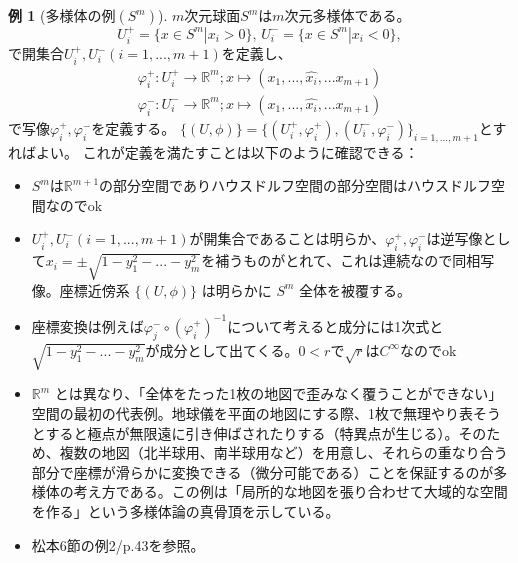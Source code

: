 \documentclass[paper=a4, fontsize=11pt]{jlreq} %
\theoremstyle{definition}
\newtheorem{example}[theorem]{例}
\begin{document}
\begin{example}[多様体の例$(S^{m})$]
    $m$次元球面$S^{m}$は$m$次元多様体である。
    \[
    U_{i}^{+} = \{x \in S^{m} | x_{i} > 0 \},\,U_{i}^{-} = \{x \in S^{m} | x_{i} < 0 \},
    \]
    で開集合$U_{i}^{+},U_{i}^{-}(i = 1,...,m+1)$を定義し、
    \begin{gather*}
    \varphi_{i}^{+} : U_{i}^{+} \to \mathbb{R}^{m} ; x \mapsto (x_1,...,\hat{x_{i}},...x_{m + 1})\\
    \varphi_{i}^{-} : U_{i}^{-} \to \mathbb{R}^{m} ; x \mapsto (x_1,...,\hat{x_{i}},...x_{m + 1})
    \end{gather*}
    で写像$\varphi_{i}^{+},\varphi_{i}^{-}$を定義する。
    $\{(U, \phi)\} = \{(U_{i}^{+}, \varphi_{i}^{+}),(U_{i}^{-}, \varphi_{i}^{-})\}_{i=1,...,m + 1}$とすればよい。
    これが定義を満たすことは以下のように確認できる：
    \begin{itemize}
        \item[(1)] $S^{m}$は$\mathbb{R}^{m+1}$の部分空間でありハウスドルフ空間の部分空間はハウスドルフ空間なのでok
        \item[(2)] $U_{i}^{+},U_{i}^{-}(i = 1,...,m+1)$が開集合であることは明らか、$\varphi_{i}^{+},\varphi_{i}^{-}$は逆写像として$x_{i}=\pm\sqrt{1 - y_{1}^2 - ... - y_{m}^{2}}$を補うものがとれて、これは連続なので同相写像。座標近傍系 $\{(U, \phi)\}$ は明らかに $S^{m}$ 全体を被覆する。
        \item[(3)] 座標変換は例えば$\varphi_{j}^{-} \circ (\varphi_{i}^{+})^{-1}$について考えると成分には1次式と$\sqrt{1 - y_{1}^2 - ... - y_{m}^{2}}$が成分として出てくる。$0 < r$で$\sqrt{r}$は$C^{\infty}$なのでok
    \end{itemize}   
    \begin{itemize}
        \item[\textbf{Insight:}] $\mathbb{R}^m$ とは異なり、「全体をたった1枚の地図で歪みなく覆うことができない」空間の最初の代表例。地球儀を平面の地図にする際、1枚で無理やり表そうとすると極点が無限遠に引き伸ばされたりする（特異点が生じる）。そのため、複数の地図（北半球用、南半球用など）を用意し、それらの重なり合う部分で座標が滑らかに変換できる（微分可能である）ことを保証するのが多様体の考え方である。この例は「局所的な地図を張り合わせて大域的な空間を作る」という多様体論の真骨頂を示している。
        \item[\textbf{Link:}] 松本6節の例2/p.43を参照。
    \end{itemize}
\end{example}
\end{document}
